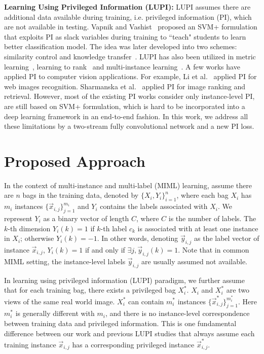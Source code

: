 \documentclass[10pt,twocolumn,letterpaper]{article}
\begin{document}
\textbf{Learning Using Privileged Information (LUPI):} LUPI
assumes there are additional data available during training, i.e.
privileged information (PI), which are not available in testing.
Vapnik and Vashist~\cite{Vapnik2009} proposed an SVM+ formulation
that exploits PI as slack variables during training to ``teach"
students to learn better classification model. The idea was later
developed into two schemes: similarity control and knowledge
transfer~\cite{Vapnik2015a}. LUPI has also been utilized in metric
learning~\cite{Fouad2013}, learning to rank~\cite{Sharmanska2013}
and multi-instance learning~\cite{Li2014}. A few works have
applied PI to computer vision applications. For example, Li et
al.~\cite{Li2014} applied PI for web images recognition.
Sharmanska et al.~\cite{Sharmanska2013} applied PI for image
ranking and retrieval. However, most of the existing PI works
consider only instance-level PI, are still based on SVM+
formulation, which is hard to be incorporated into a deep learning
framework in an end-to-end fashion. In this work, we address all
these limitations by a two-stream fully convolutional network and
a new PI loss.

\section{Proposed Approach}
In the context of multi-instance and multi-label (MIML) learning,
assume there are $n$ bags in the training data, denoted by
$\{X_i,Y_i\}_{i=1}^{n}$, where each bag $X_i$ has $m_i$ instances
$\{\vec{x}_{i,j}\}_{j=1}^{m_i}$ and $Y_i$ contains the labels
associated with $X_i$. We represent $Y_i$ as a binary vector of
length $C$, where $C$ is the number of labels. The $k$-th
dimension $Y_i(k) = 1$ if $k$-th label $c_k$ is associated with at
least one instance in $X_i$; otherwise $Y_i(k) = -1$. In other
words, denoting $\vec{y}_{i,j}$ as the label vector of instance
$\vec{x}_{i,j}$, $Y_i(k) = 1$ if and only if $\exists j,
\vec{y}_{i,j}(k) = 1$. Note that in common MIML setting, the
instance-level labels $\vec{y}_{i,j}$ are usually assumed not
available.

In learning using privileged information (LUPI) paradigm, we
further assume that for each training bag, there exists a
privileged bag $X_i^*$. $X_i$ and $X_i^*$ are two views of the
same real world image.  $X_i^*$ can contain $m_i^*$ instances
$\{\vec{x}_{i,j}^*\}_{j=1}^{m_i^*}$. Here $m_i^*$ is generally
different with $m_i$, and there is no instance-level
correspondence between training data and privileged information.
This is one fundamental difference between our work and previous
LUPI studies that always assume each training instance
$\vec{x}_{i,j}$ has a corresponding privileged instance
$\vec{x}_{i,j}^*$.
\end{document}

